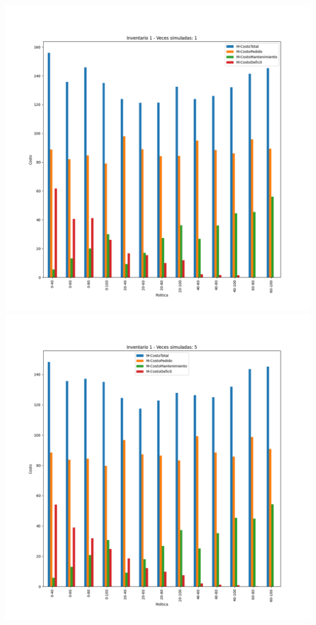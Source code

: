 \documentclass[11pt,a4paper]{report}
\begin{document}
\begin{center}
	\includegraphics[width=0.4\textheight]{img/Cap-2/inventario-1/inventario1-1veces.png}
	\includegraphics[width=0.4\textheight]{img/Cap-2/inventario-1/inventario1-5veces.png}

\end{center}
\end{document}
